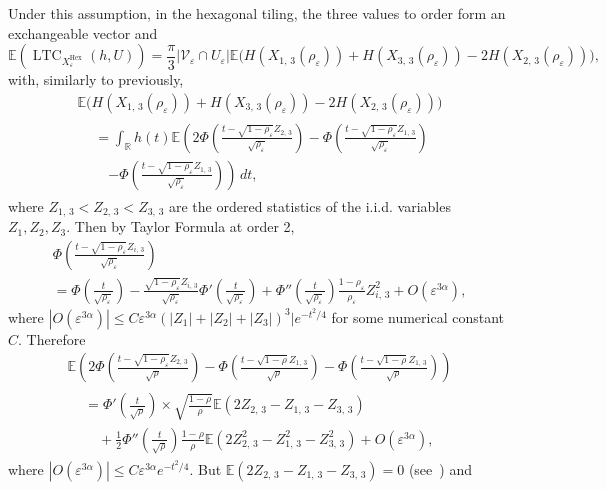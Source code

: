 \documentclass[10pt]{amsart}
\theoremstyle{definition}\newtheorem{defi}[theo]{Definition}\newtheorem{rema}[theo]{Remark}\newtheorem{exam}[theo]{Example}\newtheorem{exem}[theo]{Example}\newtheorem{nota}[theo]{Notation}
\newcommand{\R}{\mathbb{R}}
\newcommand{\E}{\mathbb{E}}
\newcommand{\eps}{\varepsilon}
\DeclareMathOperator{\LTC}{LTC}
\DeclareMathOperator{\Hex}{Hex}
\newcommand{\calV}{\mathcal{V}}
\begin{document}
Under this assumption, in the hexagonal tiling, the three values to order form an exchangeable vector and
\[
\E\left(\LTC_{X_\eps^{\Hex}}(h,U)\right)=\frac{\pi}{3}\left|\calV_\eps\cap U_\eps\right|\E\big(H(X_{1,\,3}(\rho_\eps))+H(X_{3,\,3}(\rho_\eps)) - 2H(X_{2,\,3}(\rho_\eps))\big),
\]
with, similarly to previously,
\begin{multline*}
\E\big(H(X_{1,\,3}(\rho_\eps))+H(X_{3,\,3}(\rho_\eps)) - 2H(X_{2,\,3}(\rho_\eps))\big)\\
\begin{aligned}
&=\int_\R h(t) \E\left(2\Phi\left(\frac{t-\sqrt{1-\rho_\eps}Z_{2,\,3}}{\sqrt{\rho_\eps}}\right) -\Phi\left(\frac{t-\sqrt{1-\rho_\eps}Z_{1,\,3}}{\sqrt{\rho_\eps}}\right)\right.\\
&\quad\left.-\Phi\left(\frac{t-\sqrt{1-\rho_\eps}Z_{1,\,3}}{\sqrt{\rho_\eps}}\right)\right)\,dt,
\end{aligned}
\end{multline*}
where $Z_{1,\,3}<Z_{2,\,3}<Z_{3,\,3}$ are the ordered statistics of the i.i.d. variables $Z_1, Z_2, Z_3$. Then by Taylor Formula at order 2,
\begin{multline*}
\Phi\left(\frac{t-\sqrt{1-\rho_\eps}Z_{i,\,3}}{\sqrt{\rho_\eps}}\right)\\
=\Phi\left(\frac{t}{\sqrt{\rho_\eps}}\right)-\frac{\sqrt{1-\rho_\eps}Z_{i,\,3}}{\sqrt{\rho_\eps}}\Phi'\left(\frac{t}{\sqrt{\rho_\eps}}\right)+
\Phi''\left(\frac{t}{\sqrt{\rho_\eps}}\right)\frac{{1-\rho_\eps}}{{\rho_\eps}}Z_{i,\,3}^2+O\left(\eps^{3\alpha}\right),
\end{multline*}
where $|O(\eps^{3\alpha})|\le C\eps^{3\alpha}(|Z_1|+|Z_2|+|Z_3|)^3|e^{-t^2/4}$ for some numerical constant $C$. Therefore
\begin{multline*}
\E\left(2\Phi\left(\frac{t-\sqrt{1-\rho_\eps}Z_{2,\,3}}{\sqrt{\rho}}\right)-\Phi\left(\frac{t-\sqrt{1-\rho}Z_{1,\,3}}{\sqrt{\rho}}\right)-\Phi\left(\frac{t-\sqrt{1-\rho}Z_{1,\,3}}{\sqrt{\rho}}\right)\right)
\\
\begin{aligned}
&=\Phi'\left(\frac{t}{\sqrt{\rho}}\right)\times \sqrt{\frac{1-\rho}{\rho}}\E\left(2Z_{2,\,3}-Z_{1,\,3}-Z_{3,\,3}\right)\\
&\quad+\frac{1}{2}\Phi''\left(\frac{t}{\sqrt{\rho}}\right)\frac{1-\rho}{\rho}\E\left(2Z_{2,\,3}^2-Z_{1,\,3}^2-Z_{3,\,3}^2\right)+O\left(\eps^{3\alpha}\right),
\end{aligned}
\end{multline*}
where $|O(\eps^{3\alpha})|\le C\eps^{3\alpha}e^{-t^2/4}$. But $\E(2Z_{2,\,3}-Z_{1,\,3}-Z_{3,\,3})=0$ (see~\cite[p.~101]{Nevzorov}) and
\end{document}
